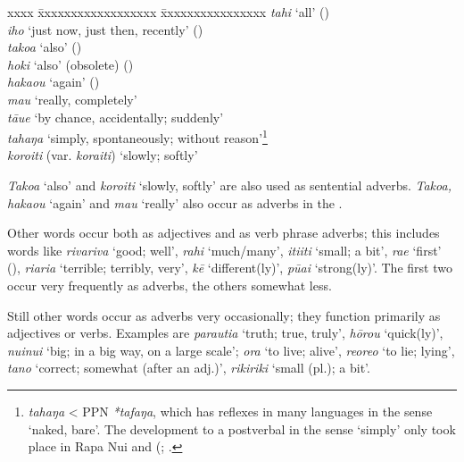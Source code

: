 \begin{tabbing}
xxxx \= xxxxxxxxxxxxxxxxxx \= xxxxxxxxxxxxxxxx \kill
\> \textit{tahi} \> ‘all’ ()\\
\> \textit{iho} \> ‘just now, just then, recently’ ()\\
\> \textit{tako{\ꞌ}a} \> ‘also’ ()\\
\> \textit{hoki} \> ‘also’ (obsolete) ()\\
\> \textit{haka{\ꞌ}ou} \> ‘again’ ()\\
\> \textit{mau} \> ‘really, completely’\\
\> \textit{tā{\ꞌ}ue} \> ‘by chance, accidentally; suddenly’\\
\> \textit{tahaŋa} \> ‘simply, spontaneously; without reason’\footnote{\label{fn:190}\textit{tahaŋa} {\textless} PPN \textit{*tafaŋa}, which has reflexes in many languages in the sense ‘naked, bare’. The development to a postverbal  in the sense ‘simply’ only took place in Rapa Nui and  (\citealt[180]{Walworth2015Thesis}; \citealt{Walworth2015Classifying}.}\\
\> \textit{koro{\ꞌ}iti} (var. \textit{kora{\ꞌ}iti}) \> ‘slowly; softly’
\end{tabbing}
\textit{Tako{\ꞌ}a} ‘also’ and \textit{koro{\ꞌ}iti} ‘slowly, softly’ are also used as sentential adverbs. \textit{\mbox{Tako{\ꞌ}a}, \mbox{haka{\ꞌ}ou}} ‘again’ and \textit{mau} ‘really’ also occur as adverbs in the .

Other words occur both as adjectives and as verb phrase adverbs; this includes words like \textit{rivariva} ‘good; well’, \textit{rahi} ‘much/many’, \textit{{\ꞌ}iti{\ꞌ}iti} ‘small; a bit’, \textit{ra{\ꞌ}e} ‘first’ (), \textit{\mbox{ri{\ꞌ}ari{\ꞌ}a}} ‘terrible; terribly, very’, \textit{kē} ‘different(ly)’, \textit{pūai} ‘strong(ly)’. The first two occur very frequently as adverbs, the others somewhat less.

Still other words occur as adverbs very occasionally; they function primarily as adjectives or verbs. Examples are \textit{parauti{\ꞌ}a} ‘truth; true, truly’, \textit{hōrou} ‘quick(ly)’, \textit{nuinui} ‘big; in a big way, on a large scale’; \textit{ora} ‘to live; alive’, \textit{reoreo} ‘to lie; lying’, \textit{tano} ‘correct; somewhat (after an adj.)’, \textit{rikiriki} ‘small (pl.); a bit’. 

